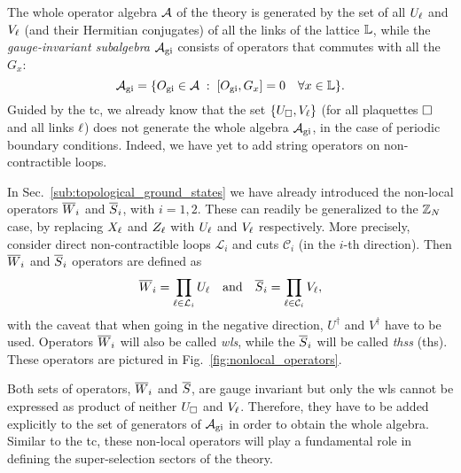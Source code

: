 \begin{figure}[t]
\end{figure}


The whole operator algebra $\mathcal{A}$ of the theory is generated by the set of all $U_\ell$ and $V_\ell$ (and their Hermitian conjugates) of all the links of the lattice $\mathbb{L}$, while the  \emph{gauge-invariant subalgebra} $\mathcal{A}_{\text{gi}}$ consists of operators that commutes with all the $G_x$:
\begin{equation}
    \mathcal{A}_{\text{gi}} = \{ O_{\text{gi}} \in \mathcal{A} \;:\; [O_{\text{gi}}, G_x] = 0 \quad \forall x \in \mathbb{L} \}.
\end{equation}
Guided by the \ac{tc}, we already know that the set $\{U_{\square}, V_\ell\}$ (for all plaquettes $\square$ and all links $\ell$) does not generate the whole algebra $\mathcal{A}_{\text{gi}}$, in the case of periodic boundary conditions.
Indeed, we have yet to add string operators on non-contractible loops.

In Sec.~\ref{sub:topological_ground_states} we have already introduced the non-local operators $\overline{W}_{i}$ and $\overline{S}_{i}$, with $i=1,2$.
These can readily be generalized to the $\mathbb{Z}_N$ case, by replacing $X_{\ell}$ and $Z_{\ell}$ with $U_{\ell}$ and $V_{\ell}$ respectively.
More precisely, consider direct non-contractible loops $\mathcal{L}_i$ and cuts $\mathcal{C}_i$ (in the $i$-th direction).
Then $\overline{W}_i$ and $\overline{S}_i$ operators are defined as
\begin{equation}
    \Wilson_i = \prod_{\link \in \mathcal{L}_i} U_\link
    \qand
    \tHooft_i = \prod_{\link \in \mathcal{C}_i} V_\link,
    \label{eq:nonlocal_op_ZN}
\end{equation}
with the caveat that when going in the negative direction, $U^{\dagger}$ and $V^{\dagger}$ have to be used.
Operators $\overline{W}_i$ will also be called \emph{\acl{wl}s}, while the $\overline{S}_i$ will be called \emph{\acl{ths}s} (\ac{ths}).
These operators are pictured in Fig.~\ref{fig:nonlocal_operators}.

Both sets of operators, $\overline{W}_i$ and $\overline{S}$, are gauge invariant but only the \ac{wl}s cannot be expressed as product of neither $U_{\square}$ and $V_{\ell}$.
Therefore, they have to be added explicitly to the set of generators of $\mathcal{A}_{\text{gi}}$ in order to obtain the whole algebra.
Similar to the \ac{tc}, these non-local operators will play a fundamental role in defining the super-selection sectors of the theory.

